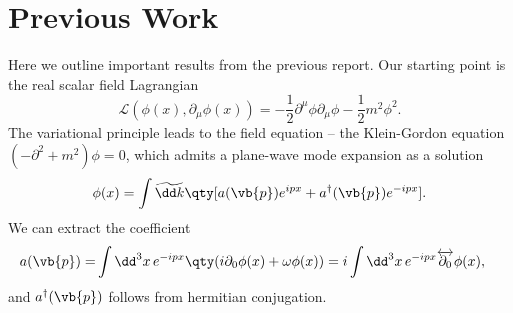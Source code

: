 \chapter*{Previous Work}
Here we outline important results from the previous report. Our starting point is the real scalar field Lagrangian
\begin{equation}
    \mathcal{L}(\phi(x),\partial_\mu\phi(x))=-\frac{1}{2}\partial^\mu\phi\partial_\mu\phi-\frac{1}{2}m^2\phi^2.
    \label{scalar_field_lagrangian}
\end{equation}
The variational principle leads to the field equation -- the Klein-Gordon equation $(-\partial^2+m^2)\phi=0$, which admits a plane-wave mode expansion as a solution
\begin{equation}
    \phi(x)=\int \widetilde{\dd k}\qty[a(\vb{p})e^{ipx}+a^\dagger(\vb{p})e^{-ipx}].
    \label{mode_expansion}
\end{equation}
We can extract the coefficient
\begin{equation}
\begin{aligned}
        a(\vb{p})=&\int\dd^3x\,e^{-ipx}\qty(i\partial_0\phi(x)+\omega\phi(x))=i\int\dd^3x\,e^{-ipx}\overleftrightarrow{\partial_0}\phi(x),
\end{aligned}
\end{equation}
and $a^\dagger(\vb{p})$ follows from hermitian conjugation.\\

